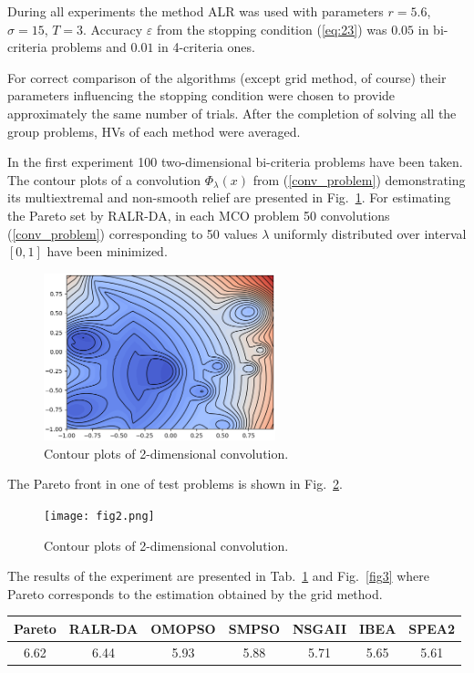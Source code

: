 \documentclass[]{interact}
\theoremstyle{plain}%
\theoremstyle{definition}
\theoremstyle{remark}
\begin{document}
During all experiments the method ALR was used with parameters $r=5.6$, $\sigma = 15$, $T=3$. Accuracy $\varepsilon$ from the stopping condition (\ref{eq:23}) was $0.05$ in bi-criteria problems and $0.01$ in 4-criteria ones.

For correct comparison of the algorithms (except grid method, of course) their parameters influencing the stopping condition were chosen to provide approximately the same number of trials. After the completion of solving all the group problems, HVs of each method were averaged.

In the first experiment 100 two-dimensional bi-criteria problems have been taken. The contour plots of a convolution $\Phi_\lambda(x)$ from (\ref{conv_problem})  demonstrating its multiextremal and non-smooth relief are presented in Fig.~\ref{fig1}. For estimating the Pareto set by RALR-DA, in each MCO problem 50 convolutions (\ref{conv_problem}) corresponding to 50 values $\lambda$ uniformly distributed over interval $[0,1]$ have been minimized.

\begin{figure}
\centering
\includegraphics[width=0.6\textwidth]{fig1.png} 
\caption{Contour plots of 2-dimensional convolution.}\label{fig1} 
\end{figure}

The Pareto front in one of test problems is shown in Fig.~\ref{fig2}.

\begin{figure}
\centering
\texttt{[image: fig2.png]} 
\caption{Contour plots of 2-dimensional convolution.}\label{fig2} 
\end{figure}

The results of the experiment are presented in Tab.~\ref{tab1} and Fig.~\ref{fig3} where Pareto corresponds to the estimation obtained by the grid method.

\begin{table}
{\begin{tabular}{ccccccc} \toprule
 Pareto & RALR-DA & OMOPSO & SMPSO & NSGAII & IBEA & SPEA2 \\ \midrule
  6.62 & 6.44 & 5.93 & 5.88 & 5.71 & 5.65 & 5.61 \\ \bottomrule
\end{tabular}}
\label{tab1}
\end{table}
\end{document}
